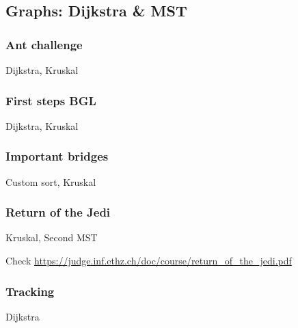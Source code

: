 \documentclass[10pt,a4paper,landscape,twocolumn,twoside]{article}
\begin{document}
	\newpage
	\subsection{Graphs: Dijkstra \& MST}

		\subsubsection{Ant challenge}
		\begin{keywords}Dijkstra, Kruskal\end{keywords}
		

		\subsubsection{First steps BGL}
		\begin{keywords}Dijkstra, Kruskal\end{keywords}
		

		\subsubsection{Important bridges}
		\begin{keywords}Custom sort, Kruskal\end{keywords}
		

		\subsubsection{Return of the Jedi}
		\begin{keywords}Kruskal, Second MST\end{keywords}

		Check \url{https://judge.inf.ethz.ch/doc/course/return_of_the_jedi.pdf}
		

		\subsubsection{Tracking}
		\begin{keywords}Dijkstra\end{keywords}
		
\end{document}
